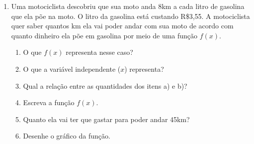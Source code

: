 \documentclass[12pt]{article}
\begin{document}
\begin{enumerate}
	\item Uma motociclista descobriu que sua moto anda 8km a cada litro de
		gasolina que ela põe na moto. O litro da gasolina está custando 
		R\$3,55. A motociclista quer saber quantos km ela vai poder andar 
		com sua moto de acordo com quanto dinheiro ela põe em gasolina por
		meio de uma função $f(x)$.
	\begin{enumerate}
		\item O que $f(x)$ representa nesse caso?
		\item O que a variável independente ($x$) representa?
		\item Qual a relação entre as quantidades dos itens a) e b)?
		\item Escreva a função $f(x)$.
		\item Quanto ela vai ter que gastar para poder andar 45km?
		\item Desenhe o gráfico da função.
	\end{enumerate}
\end{enumerate}

\newpage
\end{document}
